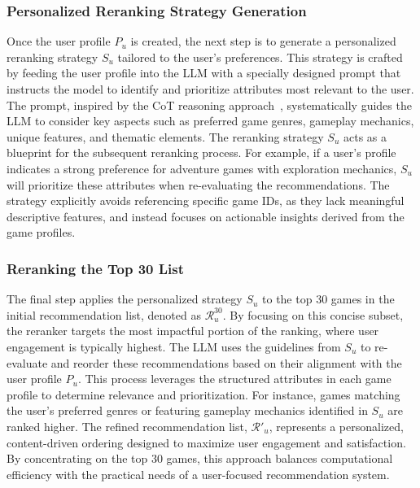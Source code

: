 \subsubsection{Personalized Reranking Strategy Generation}
Once the user profile $P_u$ is created, the next step is to generate a personalized reranking strategy $S_u$ tailored to the user’s preferences. This strategy is crafted by feeding the user profile into the LLM with a specially designed prompt that instructs the model to identify and prioritize attributes most relevant to the user. The prompt, inspired by the CoT reasoning approach~\cite{wei2022chain}, systematically guides the LLM to consider key aspects such as preferred game genres, gameplay mechanics, unique features, and thematic elements. The reranking strategy $S_u$ acts as a blueprint for the subsequent reranking process. For example, if a user’s profile indicates a strong preference for adventure games with exploration mechanics, $S_u$ will prioritize these attributes when re-evaluating the recommendations. The strategy explicitly avoids referencing specific game IDs, as they lack meaningful descriptive features, and instead focuses on actionable insights derived from the game profiles. 

\subsubsection{Reranking the Top 30 List}
The final step applies the personalized strategy $S_u$ to the top 30 games in the initial recommendation list, denoted as $\mathcal{R}_u^{30}$. By focusing on this concise subset, the reranker targets the most impactful portion of the ranking, where user engagement is typically highest. The LLM uses the guidelines from $S_u$ to re-evaluate and reorder these recommendations based on their alignment with the user profile $P_u$. This process leverages the structured attributes in each game profile to determine relevance and prioritization. For instance, games matching the user’s preferred genres or featuring gameplay mechanics identified in $S_u$ are ranked higher. The refined recommendation list, $\mathcal{R}'_u$, represents a personalized, content-driven ordering designed to maximize user engagement and satisfaction. By concentrating on the top 30 games, this approach balances computational efficiency with the practical needs of a user-focused recommendation system.